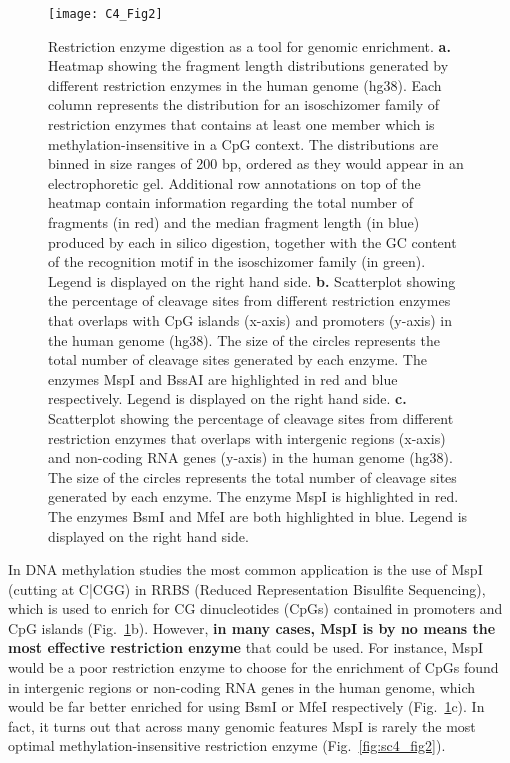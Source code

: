 \begin{figure}[htbp!] 
	\centering    
	\texttt{[image: C4\_Fig2]}
	\vspace*{3mm}
	\caption[Restriction enzyme digestion as a tool for genomic enrichment]{Restriction enzyme digestion as a tool for genomic enrichment. \textbf{a.} Heatmap showing the fragment length distributions generated by different restriction enzymes in the human genome (\acrshort{hg38}). Each column represents the distribution for an isoschizomer family of restriction enzymes that contains at least one member which is methylation-insensitive in a CpG context. The distributions are binned in size ranges of 200 \acrshort{bp}, ordered as they would appear in an electrophoretic gel. Additional row annotations on top of the heatmap contain information regarding the total number of fragments (in red) and the median fragment length (in blue) produced by each in silico digestion, together with the GC content of the recognition motif in the isoschizomer family (in green). Legend is displayed on the right hand side. \textbf{b.} Scatterplot showing the percentage of cleavage sites from different restriction enzymes that overlaps with CpG islands (x-axis) and promoters (y-axis) in the human genome (hg38). The size of the circles represents the total number of cleavage sites generated by each enzyme. The enzymes MspI and BssAI are highlighted in red and blue respectively. Legend is displayed on the right hand side. \textbf{c.} Scatterplot showing the percentage of cleavage sites from different restriction enzymes that overlaps with intergenic regions (x-axis) and non-coding \acrshort{RNA} genes (y-axis) in the human genome (hg38). The size of the circles represents the total number of cleavage sites generated by each enzyme. The enzyme MspI is highlighted in red. The enzymes BsmI and MfeI are both highlighted in blue. Legend is displayed on the right hand side.}
	\label{fig:c4_fig2}
\end{figure}

\bigskip

In DNA methylation studies the most common application is the use of MspI (cutting at C|CGG) in RRBS (Reduced Representation Bisulfite Sequencing), which is used to enrich for CG dinucleotides (CpGs) contained in promoters and CpG islands \cite{Meissner2008} (Fig.~\ref{fig:c4_fig2}b). However, \textbf{in many cases, MspI is by no means the most effective restriction enzyme} that could be used. For instance, MspI would be a poor restriction enzyme to choose for the enrichment of CpGs found in intergenic regions or non-coding RNA genes in the human genome, which would be far better enriched for using BsmI or MfeI respectively (Fig.~\ref{fig:c4_fig2}c). In fact, it turns out that across many genomic features MspI is rarely the most optimal methylation-insensitive restriction enzyme (Fig.~\ref{fig:sc4_fig2}). 

